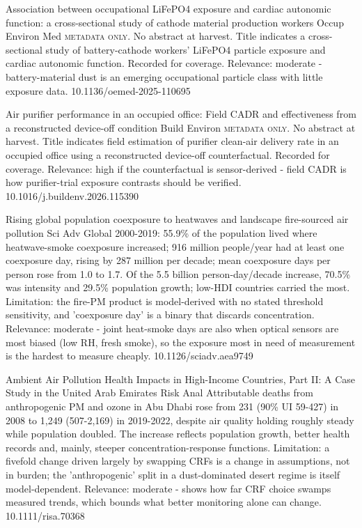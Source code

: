 \documentclass[10pt]{article}
\begin{document}
{Association between occupational LiFePO4 exposure and cardiac autonomic function: a cross-sectional study of cathode material production workers}
{Occup Environ Med}
{\textsc{metadata only.} No abstract at harvest. Title indicates a cross-sectional study of battery-cathode workers' LiFePO4 particle exposure and cardiac autonomic function. Recorded for coverage. Relevance: moderate - battery-material dust is an emerging occupational particle class with little exposure data.}
{10.1136/oemed-2025-110695}

{Air purifier performance in an occupied office: Field CADR and effectiveness from a reconstructed device-off condition}
{Build Environ}
{\textsc{metadata only.} No abstract at harvest. Title indicates field estimation of purifier clean-air delivery rate in an occupied office using a reconstructed device-off counterfactual. Recorded for coverage. Relevance: high if the counterfactual is sensor-derived - field CADR is how purifier-trial exposure contrasts should be verified.}
{10.1016/j.buildenv.2026.115390}

\par{}\baselineskip{}\baselineskip
{}

{Rising global population coexposure to heatwaves and landscape fire-sourced air pollution}
{Sci Adv}
{Global 2000-2019: 55.9\% of the population lived where heatwave-smoke coexposure increased; 916 million people/year had at least one coexposure day, rising by 287 million per decade; mean coexposure days per person rose from 1.0 to 1.7. Of the 5.5 billion person-day/decade increase, 70.5\% was intensity and 29.5\% population growth; low-HDI countries carried the most. Limitation: the fire-PM product is model-derived with no stated threshold sensitivity, and 'coexposure day' is a binary that discards concentration. Relevance: moderate - joint heat-smoke days are also when optical sensors are most biased (low RH, fresh smoke), so the exposure most in need of measurement is the hardest to measure cheaply.}
{10.1126/sciadv.aea9749}

{Ambient Air Pollution Health Impacts in High-Income Countries, Part II: A Case Study in the United Arab Emirates}
{Risk Anal}
{Attributable deaths from anthropogenic PM and ozone in Abu Dhabi rose from 231 (90\% UI 59-427) in 2008 to 1,249 (507-2,169) in 2019-2022, despite air quality holding roughly steady while population doubled. The increase reflects population growth, better health records and, mainly, steeper concentration-response functions. Limitation: a fivefold change driven largely by swapping CRFs is a change in assumptions, not in burden; the 'anthropogenic' split in a dust-dominated desert regime is itself model-dependent. Relevance: moderate - shows how far CRF choice swamps measured trends, which bounds what better monitoring alone can change.}
{10.1111/risa.70368}
\end{document}
